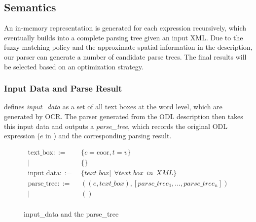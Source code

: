 \subsection{Semantics}
\label{sec:semantics}
An in-memory representation is generated for each expression recursively, 
which eventually builds into a complete parsing tree given an input XML.
Due to the fuzzy matching policy and the approximate spatial information
in the description, our parser can generate a number of candidate parse
trees.  The final results will be selected based on an optimization strategy.

\subsubsection{Input Data and Parse Result}
 defines {\em input\_data} as a set of all text boxes 
at the word level, which are generated by OCR. The parser generated from the
ODL description then takes this input data 
and outputs a {\em parse\_tree}, 
which records the original ODL expression ($e$ in )
and the corresponding parsing result.

\begin{figure}[ht]
\small
\centering
\begin{align*}
\text{text\_box} ::=~&\{c=\text{coor}, t=v\}\\
		   |~& \{\}\\
\text{input\_data} ::=~&\{text\_box | ~~ \forall text\_box ~~in ~~XML\}\\
\text{parse\_tree} ::=~&((e,text\_box), [parse\_tree_1,...,parse\_tree_n])\\
		   |~& ()\\
\end{align*}
\caption{input\_data and the parse\_tree}
\label{fig:data}
\end{figure}

